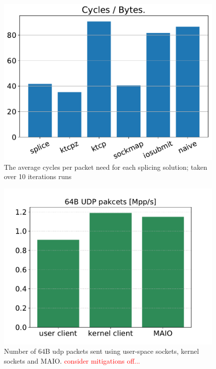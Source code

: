 \begin{figure}[t]
    \centering
    \includegraphics[width=\columnwidth]{Figure_1.pdf}
    \caption{The average cycles per packet need for each splicing solution; taken over 10 iterations runs }
    \label{fig:cyc_byte}
\end{figure}
\begin{figure}[t]
    \centering
    \includegraphics[width=\columnwidth]{bifurcated.pdf}
    \caption{Number of 64B udp packets sent using user-space sockets, kernel sockets and MAIO. \textcolor{red}{consider mitigations off...}}
    \label{fig:pps}
\end{figure}
